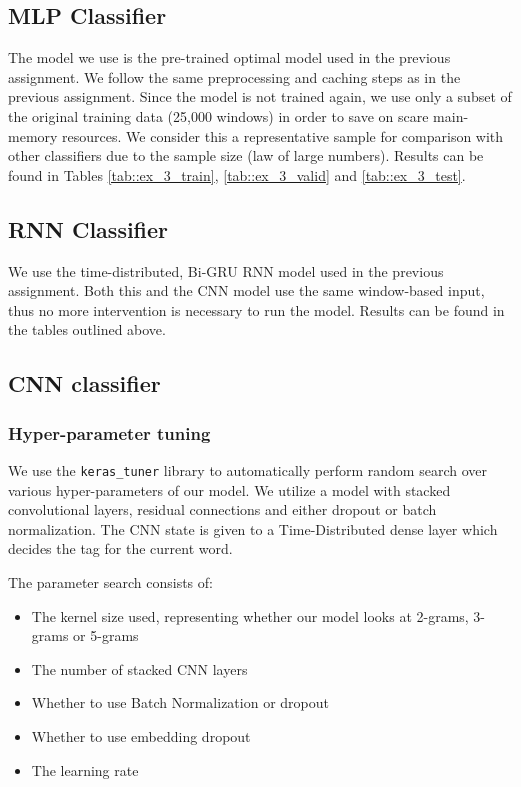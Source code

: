 \documentclass[10pt, a4paper]{article}
\begin{document}
	
	\subsection{MLP Classifier}
	
	The model we use is the pre-trained optimal model used in the previous assignment. We follow the same preprocessing and caching steps as in the previous assignment. Since the model is not trained again, we use only a subset of the original training data (25,000 windows) in order to save on scare main-memory resources. We consider this a representative sample for comparison with other classifiers due to the sample size (law of large numbers). Results can be found in Tables \ref{tab::ex_3_train}, \ref{tab::ex_3_valid} and \ref{tab::ex_3_test}.
	
	
	\subsection{RNN Classifier}
	
	We use the time-distributed, Bi-GRU RNN model used in the previous assignment. Both this and the CNN model use the same window-based input, thus no more intervention is necessary to run the model. Results can be found in the tables outlined above.
	
	
	\subsection{CNN classifier}
	
	\subsubsection{Hyper-parameter tuning}
	
	We use the \texttt{keras\_tuner} library to automatically perform random search over various hyper-parameters of our model. We utilize a model with stacked convolutional layers, residual connections and either dropout or batch normalization. The CNN state is given to a Time-Distributed dense layer which decides the tag for the current word.
	
	The parameter search consists of:
	\begin{itemize}
		\item The kernel size used, representing whether our model looks at 2-grams, 3-grams or 5-grams
		\item The number of stacked CNN layers
		\item Whether to use Batch Normalization or dropout
		\item Whether to use embedding dropout
		\item The learning rate
	\end{itemize}
	
\end{document}
